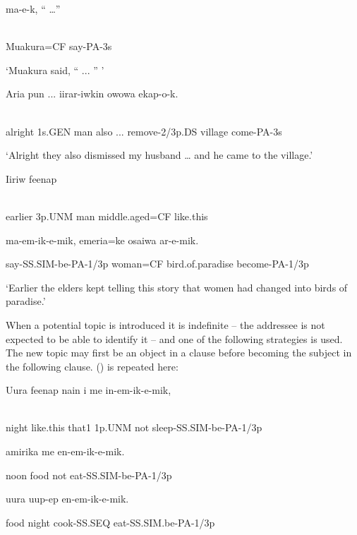 \ea%
\label{ex:x1664}
\gll {}  ma-e-k,  ``  {\dots''} \\
      \\
\glt
\z

Muakura=CF  say-PA-3s

`Muakura said, `` ... '' '

\ea%
\label{ex:x1665}
\gll Aria   pun  ...  iirar-iwkin  owowa  ekap-o-k. \\
      \\
\glt
\z

alright  1s.GEN  man  also  ...  remove-2/3p.DS  village  come-PA-3s

`Alright they also dismissed my husband {\dots} and he came to the village.'

\ea%
\label{ex:x1667}
\gll Iiriw      feenap  \\
      \\
\glt
\z

earlier  3p.UNM  man  middle.aged=CF  like.this

ma-em-ik-e-mik,  emeria=ke  osaiwa  ar-e-mik.

say-SS.SIM-be-PA-1/3p  woman=CF  bird.of.paradise  become-PA-1/3p

`Earlier the elders kept telling this story that women had changed into birds of paradise.'

When a potential topic is introduced it is indefinite -- the addressee is not expected to be able to identify it -- and one of the following strategies is used. The new topic may  first be an object in a clause before becoming the subject in the following clause. () is repeated here: 

\ea%
\label{ex:x1668}
\gll Uura  feenap  nain  i  me  in-em-ik-e-mik, \\
      \\
\glt
\z

night  like.this  that1  1p.UNM  not  sleep-SS.SIM-be-PA-1/3p

amirika    me  en-em-ik-e-mik.

noon  food  not  eat-SS.SIM-be-PA-1/3p

  uura  uup-ep  en-em-ik-e-mik.

food  night  cook-SS.SEQ  eat-SS.SIM.be-PA-1/3p


